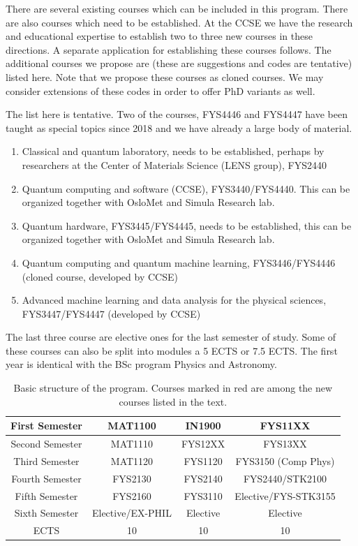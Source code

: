 \documentclass[aps,rmp,preprint,amsmath,amssymb,graphicx,longbibliography]{revtex4-1}
\begin{document}
There are several existing courses which can be included in this program. There are also courses which need to be established. At the CCSE we have the research and educational expertise to establish two to three new courses in these directions.
A separate application for establishing these courses follows. The additional courses we propose are (these are suggestions and codes are tentative) listed here. Note that we propose these courses as cloned courses. We may consider extensions of these codes in order to offer PhD variants as well.


The list here is tentative. Two of the courses, FYS4446 and FYS4447 have been taught as special topics since 2018 and we have already a large body of material.
\begin{enumerate}
    \item \color{red} Classical and quantum laboratory, needs to be established, perhaps by researchers at the Center of Materials Science (LENS group), FYS2440
    \item Quantum computing and software (CCSE), FYS3440/FYS4440. This can be organized together with OsloMet and Simula Research lab.
    \item Quantum hardware, FYS3445/FYS4445, needs to be established, this can be organized together with OsloMet and Simula Research lab. 
    \item Quantum computing and quantum machine learning, FYS3446/FYS4446 (cloned course, developed by CCSE)
    \item Advanced machine learning and data analysis for the physical sciences, FYS3447/FYS4447 (developed by CCSE)
\end{enumerate}

The last three course are elective ones for the last semester of study. Some of these courses can also be split into modules a 5 ECTS or 7.5 ECTS.
The first year is identical with the BSc program Physics and Astronomy.

\begin{table}
 \caption{Basic structure of the program. Courses marked in red are among the new courses listed in the text.}
    \centering
    \begin{tabular}{|c|c|c|c|} \hline
    First Semester & MAT1100 &  IN1900   & FYS11XX  \\ \hline 
    Second Semester & MAT1110 & FYS12XX  & FYS13XX \\ \hline
    Third Semester & MAT1120 &   FYS1120  &  FYS3150 (Comp Phys)\\ \hline
    Fourth Semester & FYS2130 & FYS2140    & \color{red} {FYS2440}/STK2100 \\ \hline       
    Fifth Semester & FYS2160 & FYS3110     & \color{red}Elective/FYS-STK3155 \\ \hline
    Sixth Semester & \color{red} Elective/EX-PHIL & \color{red} Elective    & \color{red} Elective \\ \hline
   ECTS & 10 &  10   &  10  \\ \hline    
    \end{tabular}
\end{table}



\end{document}
